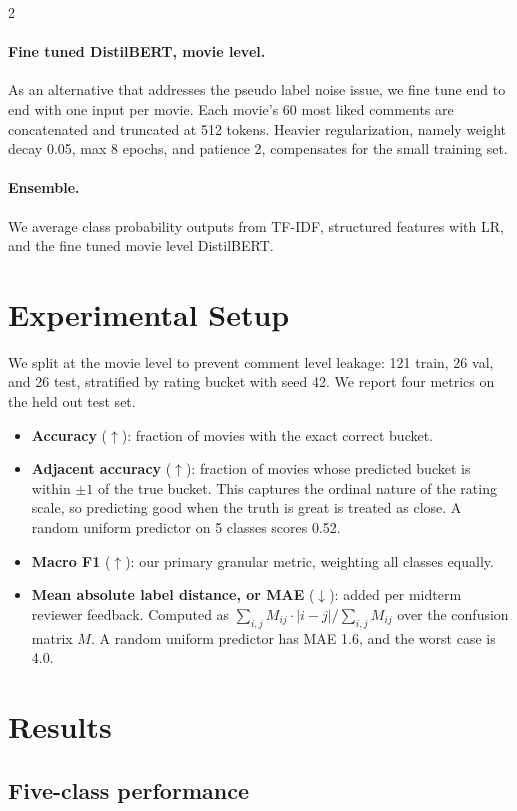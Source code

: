 \documentclass[10pt,letterpaper]{article}
\begin{document}
\begin{multicols}{2}
\paragraph{Fine tuned DistilBERT, movie level.} As an alternative that addresses the pseudo label noise issue, we fine tune end to end with one input per movie. Each movie's 60 most liked comments are concatenated and truncated at 512 tokens. Heavier regularization, namely weight decay 0.05, max 8 epochs, and patience 2, compensates for the small training set.

\paragraph{Ensemble.} We average class probability outputs from TF-IDF, structured features with LR, and the fine tuned movie level DistilBERT.

\section{Experimental Setup}
\noindent We split at the movie level to prevent comment level leakage: 121 train, 26 val, and 26 test, stratified by rating bucket with seed 42. We report four metrics on the held out test set.
\begin{itemize}
\item \textbf{Accuracy} ($\uparrow$): fraction of movies with the exact correct bucket.
\item \textbf{Adjacent accuracy} ($\uparrow$): fraction of movies whose predicted bucket is within $\pm 1$ of the true bucket. This captures the ordinal nature of the rating scale, so predicting good when the truth is great is treated as close. A random uniform predictor on 5 classes scores 0.52.
\item \textbf{Macro F1} ($\uparrow$): our primary granular metric, weighting all classes equally.
\item \textbf{Mean absolute label distance, or MAE} ($\downarrow$): added per midterm reviewer feedback. Computed as $\sum_{i,j} M_{ij}\cdot|i-j| / \sum_{i,j} M_{ij}$ over the confusion matrix $M$. A random uniform predictor has MAE 1.6, and the worst case is 4.0.
\end{itemize}
\vspace{-20pt}
\section{Results}

\subsection{Five-class performance}


\end{multicols}
\end{document}
